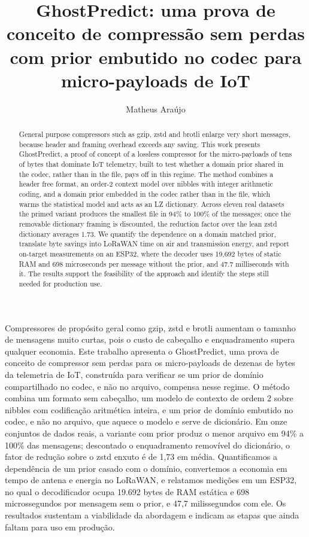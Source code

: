 \documentclass[12pt]{article}
\title{GhostPredict: uma prova de conceito de compressão sem perdas\\
com prior embutido no codec para micro-payloads de IoT}
\author{Matheus Araújo\inst{1}}
\begin{document}
\maketitle

\begin{abstract}
  General purpose compressors such as gzip, zstd and brotli enlarge very short
  messages, because header and framing overhead exceeds any saving. This work
  presents GhostPredict, a proof of concept of a lossless compressor for the
  micro-payloads of tens of bytes that dominate IoT telemetry, built to test
  whether a domain prior shared in the codec, rather than in the file, pays off
  in this regime. The method combines a header free
  format, an order-2 context model over nibbles with integer arithmetic coding,
  and a domain prior embedded in the codec rather than in the file, which warms
  the statistical model and acts as an LZ dictionary. Across eleven real
  datasets the primed variant produces the smallest file in 94\% to 100\% of
  the messages; once the removable dictionary framing is discounted, the
  reduction factor over the lean zstd dictionary averages 1.73. We quantify the
  dependence on a domain matched prior, translate byte savings into LoRaWAN
  time on air and transmission energy, and report on-target measurements on an
  ESP32, where the decoder uses 19,692 bytes of static RAM and 698 microseconds
  per message without the prior, and 47.7 milliseconds with it. The results
  support the feasibility of the approach and identify the steps still needed
  for production use.
\end{abstract}

\begin{resumo}
  Compressores de propósito geral como gzip, zstd e brotli aumentam o tamanho
  de mensagens muito curtas, pois o custo de cabeçalho e enquadramento supera
  qualquer economia. Este trabalho apresenta o GhostPredict, uma prova de
  conceito de compressor sem perdas para os micro-payloads de dezenas de bytes
  da telemetria de IoT, construída para verificar se um prior de domínio
  compartilhado no codec, e não no arquivo, compensa nesse regime. O
  método combina um formato sem cabeçalho, um modelo de contexto de ordem 2
  sobre nibbles com codificação aritmética inteira, e um prior de domínio
  embutido no codec, e não no arquivo, que aquece o modelo e serve de
  dicionário. Em onze conjuntos de dados reais, a variante com prior produz o
  menor arquivo em 94\% a 100\% das mensagens; descontado o enquadramento
  removível do dicionário, o fator de redução sobre o zstd enxuto é de 1,73 em
  média. Quantificamos a dependência de um prior casado com o domínio,
  convertemos a economia em tempo de antena e energia no LoRaWAN, e relatamos
  medições em um ESP32, no qual o decodificador ocupa 19.692 bytes de RAM
  estática e 698 microssegundos por mensagem sem o prior, e 47,7 milissegundos
  com ele. Os resultados sustentam a viabilidade da abordagem e indicam as
  etapas que ainda faltam para uso em produção.
\end{resumo}
\end{document}
